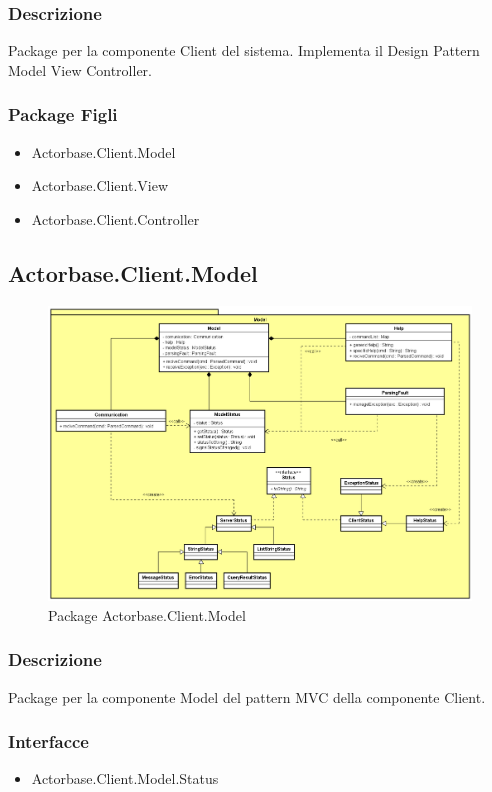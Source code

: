 \documentclass[a4paper]{article}
\begin{document}
		\subsubsection{Descrizione}
			Package per la componente Client del sistema. Implementa il Design Pattern Model View Controller.
		\subsubsection{Package Figli}
			\begin{itemize}
				\item Actorbase.Client.Model
				\item Actorbase.Client.View
				\item Actorbase.Client.Controller
			\end{itemize}
			
	\subsection{Actorbase.Client.Model}
		\begin{figure} [H]
			\centering
			\includegraphics[scale=0.42]{ST/Client/ModelClasses.png}
        	\caption{Package Actorbase.Client.Model}
		\end{figure}
		\subsubsection{Descrizione}
			Package per la componente Model del pattern MVC della componente Client.
		\subsubsection{Interfacce}
			\begin{itemize}
				\item Actorbase.Client.Model.Status
			\end{itemize}
\end{document}
